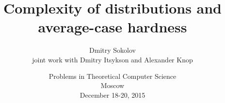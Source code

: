 

\title[Complexity of distributions and average-case hardness]{
	Complexity of distributions and average-case hardness
}
  
\author[Sokolov D.]{Dmitry Sokolov\\ joint work with Dmitry Itsykson and Alexander Knop}

\date{Problems in Theoretical Computer Science\\
	Moscow\\
	December 18-20, 2015
}



	\maketitle

	
    
    



